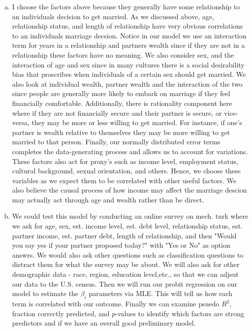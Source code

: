 \documentclass[dvips,12pt]{article}
\begin{document}
\begin{enumerate}[a.]
	\item I choose the factors above because they generally have some relationship to an individuals decision to get married. As we discussed above, age, relationship status, and length of relationship have very obvious correlations to an individuals marriage decsion. Notice in our model we use an interaction term for years in a relationship and partners wealth since if they are not in a relationship these factors have no meaning. We also consider sex, and the interaction of age and sex since in many cultures there is a social desirability bias that proscribes when individuals of a certain sex should get married. We also look at individual wealth, partner wealth and the interaction of the two since people are generally more likely to embark on marriage if they feel financially comfortable. Additionally, there is rationality component here where if they are not financially secure and their partner is secure, or vice-versa, they may be more or less willing to get married. For instance, if one's partner is wealth relative to themselves they may be more willing to get married to that person. Finally, our normally distributed error terms completes the data-generating process and allows us to account for variations. These factors also act for proxy's such as income level, employment status, cultural background, sexual orientation, and others. Hence, we choose these variables as we expect them to be correlated with other useful factors. We also believe the causal process of how income may affect the marriage descion may actually act through age and wealth rather than be direct. 
	\item We could test this model by conducting an online survey on mech. turk where we ask for age, sex, est. income level, est. debt level, relationship status, est. partner income, est. partner debt, length of relationship, and then "Would you say yes if your partner proposed today?" with "Yes or No" as option answrs. We would also ask other questions such as classification questions to distract them for what the survey may be about. We will also ask for other demographic data - race, region, education level,etc., so that we can adjsut our data to the U.S. census. Then we will run our probit regression on our model to estimate the $\beta_i$ parameters via MLE. This will tell us how each term is correlated with our outcome. Finally we can examine psuedo $R^2$, fraction correctly predicted, and $p$-values to identify which factors are strong predictors and if we have an overall good preliminary model.
\end{enumerate}
\end{document}

